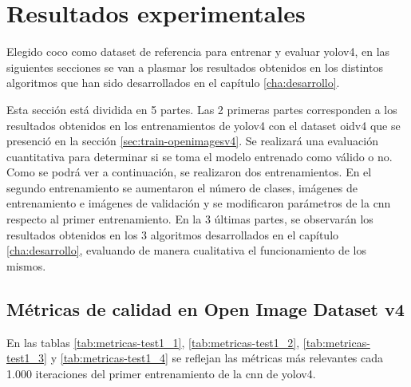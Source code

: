 \section{Resultados experimentales}
\label{sec:resultados-experimentales}

Elegido \gls{coco} como dataset de referencia para entrenar y evaluar \gls{yolov4}, en las siguientes secciones se van a plasmar los resultados obtenidos en los distintos algoritmos que han sido desarrollados en el capítulo \ref{cha:desarrollo}.

Esta sección está dividida en 5 partes. Las 2 primeras partes corresponden a los resultados obtenidos en los entrenamientos de \gls{yolov4} con el dataset \gls{oidv4} que se presenció en la sección \ref{sec:train-openimagesv4}. Se realizará una evaluación cuantitativa para determinar si se toma el modelo entrenado como válido o no. Como se podrá ver a continuación, se realizaron dos entrenamientos. En el segundo entrenamiento se aumentaron el número de clases, imágenes de entrenamiento e imágenes de validación y se modificaron parámetros de la \gls{cnn} respecto al primer entrenamiento. En la 3 últimas partes, se observarán los resultados obtenidos en los 3 algoritmos desarrollados en el capítulo \ref{cha:desarrollo}, evaluando de manera cualitativa el funcionamiento de los mismos.

\subsection{Métricas de calidad en Open Image Dataset v4}
\label{subsec:metricas-calidad-openimagesv4}

En las tablas \ref{tab:metricas-test1_1}, \ref{tab:metricas-test1_2}, \ref{tab:metricas-test1_3} y \ref{tab:metricas-test1_4} se reflejan las métricas más relevantes cada 1.000 iteraciones del primer entrenamiento de la \gls{cnn} de \gls{yolov4}.

